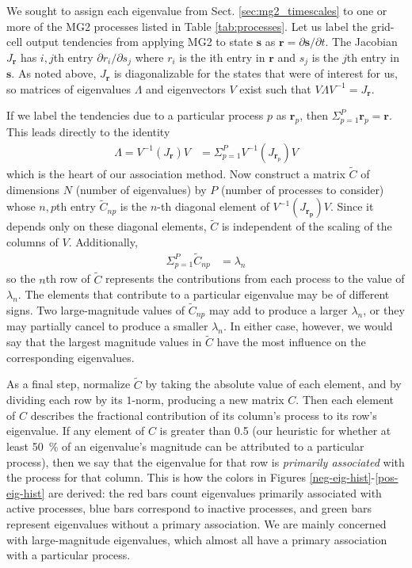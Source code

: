 \documentclass [11pt, proquest] {uwthesis}[2020/02/24]
\begin{document}
We sought to assign each eigenvalue from Sect. \ref{sec:mg2_timescales} to one or more of the MG2 processes listed in Table \ref{tab:processes}. Let us label the grid-cell output tendencies from applying MG2 to state $\mathbf{s}$ as $\mathbf{r} = \partial \mathbf{s}/\partial t$. The Jacobian $J_{\mathbf{r}}$ has $i,j$th entry $\partial r_i/\partial s_j$ where $r_i$ is the ith entry in $\mathbf{r}$ and $s_j$ is the $j$th entry in $\mathbf{s}$. As noted above, $J_{\mathbf{r}}$ is diagonalizable for the states that were of interest for us, so matrices of eigenvalues $\Lambda$ and eigenvectors $V$ exist such that $V \Lambda V^{-1} = J_{\mathbf{r}}$.

If we label the tendencies due to a particular process $p$ as $\mathbf{r}_p$, then $\Sigma_{p=1}^{P}\mathbf{r}_p = \mathbf{r}$. This leads directly to the identity
\begin{eqnarray}
  \Lambda = V^{-1} (J_{\mathbf{r}}) V &= \Sigma_{p=1}^{P}V^{-1} (J_{\mathbf{r}_p}) V
\end{eqnarray}
which is the heart of our association method. Now construct a matrix $\tilde{C}$ of dimensions $N$ (number of eigenvalues) by $P$ (number of processes to consider) whose $n,p$th entry $\tilde{C}_{np}$ is the $n$-th diagonal element of $V^{-1} (J_{\mathbf{r_p}})V$. Since it depends only on these diagonal elements, $\tilde{C}$ is independent of the scaling of the columns of $V$. Additionally,
\begin{eqnarray}
  \Sigma_{p=1}^{P}\tilde{C}_{np} &= \lambda_{n}
\end{eqnarray}
so the $n$th row of $\tilde{C}$ represents the contributions from each process to the value of $\lambda_{n}$. The elements that contribute to a particular eigenvalue may be of different signs. Two large-magnitude values of $\tilde{C}_{np}$ may add to produce a larger $\lambda_{n}$, or they may partially cancel to produce a smaller $\lambda_{n}$. In either case, however, we would say that the largest magnitude values in $\tilde{C}$ have the most influence on the corresponding eigenvalues.

As a final step, normalize $\tilde{C}$ by taking the absolute value of each element, and by dividing each row by its $1$-norm, producing a new matrix $C$. Then each element of $C$ describes the fractional contribution of its column's process to its row's eigenvalue. If any element of $C$ is greater than \num{0.5} (our heuristic for whether at least \SI{50}{\percent} of an eigenvalue's magnitude can be attributed to a particular process), then we say that the eigenvalue for that row is \emph{primarily associated} with the process for that column. This is how the colors in Figures \ref{neg-eig-hist}-\ref{pos-eig-hist} are derived: the red bars count eigenvalues primarily associated with active processes, blue bars correspond to inactive processes, and green bars represent eigenvalues without a primary association. We are mainly concerned with large-magnitude eigenvalues, which almost all have a primary association with a particular process.
\end{document}
